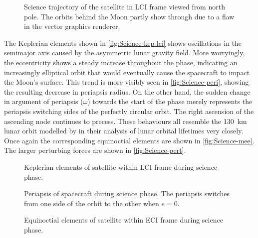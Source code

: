 \begin{figure}[h]
\centering
\def\svgwidth{\figurewidth}

\caption{Science trajectory of the satellite in LCI frame viewed from north pole. The orbits behind the Moon partly show through due to a flaw in the vector graphics renderer.} \label{fig:Science-3D-lci}
\end{figure}

%

The Keplerian elements shown in \autoref{fig:Science-kep-lci} shows oscillations in the semimajor axis caused by the asymmetric lunar gravity field. More worryingly, the eccentricity shows a steady increase throughout the phase, indicating an increasingly elliptical orbit that would eventually cause the spacecraft to impact the Moon's surface. This trend is more visibly seen in \autoref{fig:Science-peri}, showing the resulting decrease in periapsis radius. On the other hand, the sudden change in argument of periapsis ($\omega$) towards the start of the phase merely represents the periapsis switching sides of the perfectly circular orbit. The right ascension of the ascending node continues to precess. These behaviours all resemble the 130~km lunar orbit modelled by \textcite{Gupta2011} in their analysis of lunar orbital lifetimes very closely. Once again the corresponding equinoctial elements are shown in \autoref{fig:Science-mee}. The larger perturbing forces are shown in \autoref{fig:Science-pert}.

\begin{figure}
\centering
\def\svgwidth{\figurewidth}

\caption{Keplerian elements of satellite within LCI frame during science phase.} \label{fig:Science-kep-lci}
\end{figure}

\begin{figure}
\centering
\def\svgwidth{\figurewidth}

\caption{Periapsis of spacecraft during science phase. The periapsis switches from one side of the orbit to the other when $e=0$.} \label{fig:Science-peri}
\end{figure}

\begin{figure}
\centering
\def\svgwidth{\figurewidth}

\caption{Equinoctial elements of satellite within ECI frame during science phase.} \label{fig:Science-mee}
\end{figure}

